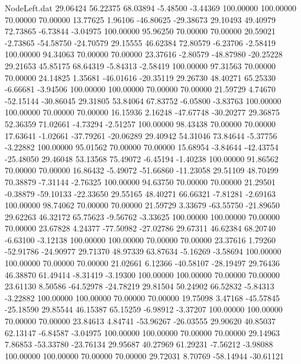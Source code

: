 \begin{filecontents}{NodeLeft.dat}
  29.06424   56.22375   68.03894    -5.48500   -3.44369  100.00000  100.00000   70.00000   70.00000   13.77625    1.96106  -46.80625  -29.38673
  29.10493   49.40979   72.73865    -6.73844   -3.04975  100.00000   95.96250   70.00000   70.00000   20.59021   -2.73865  -54.58750  -24.70579
  29.15555   46.62384   72.80579    -6.23706   -2.58419  100.00000   94.34063   70.00000   70.00000   23.37616   -2.80579  -48.87980  -20.25228
  29.21653   45.85175   68.64319    -5.84313   -2.58419  100.00000   97.31563   70.00000   70.00000   24.14825    1.35681  -46.01616  -20.35119
  29.26730   48.40271   65.25330    -6.66681   -3.94506  100.00000  100.00000   70.00000   70.00000   21.59729    4.74670  -52.15144  -30.86045
  29.31805   53.84064   67.83752    -6.05800   -3.83763  100.00000  100.00000   70.00000   70.00000   16.15936    2.16248  -47.67748  -30.20277
  29.36875   52.36359   71.02661    -4.73294   -2.51257  100.00000   98.43438   70.00000   70.00000   17.63641   -1.02661  -37.79261  -20.06289
  29.40942   54.31046   73.84644    -5.37756   -3.22882  100.00000   95.01562   70.00000   70.00000   15.68954   -3.84644  -42.43754  -25.48050
  29.46048   53.13568   75.49072    -6.45194   -1.40238  100.00000   91.86562   70.00000   70.00000   16.86432   -5.49072  -51.66860  -11.23058
  29.51109   48.70499   70.38879    -7.31144   -2.76325  100.00000   94.63750   70.00000   70.00000   21.29501   -0.38879  -59.10133  -22.33650
  29.55165   48.40271   66.66321    -7.81281   -2.69163  100.00000   98.74062   70.00000   70.00000   21.59729    3.33679  -63.55750  -21.89650
  29.62263   46.32172   65.75623    -9.56762   -3.33625  100.00000  100.00000   70.00000   70.00000   23.67828    4.24377  -77.50982  -27.02786
  29.67311   46.62384   68.20740    -6.63100   -3.12138  100.00000  100.00000   70.00000   70.00000   23.37616    1.79260  -52.91786  -24.90977
  29.71370   48.97339   63.87634    -5.16269   -3.58694  100.00000  100.00000   70.00000   70.00000   21.02661    6.12366  -40.58107  -28.19497
  29.76436   46.38870   61.49414    -8.31419   -3.19300  100.00000  100.00000   70.00000   70.00000   23.61130    8.50586  -64.52978  -24.78219
  29.81504   50.24902   66.52832    -5.84313   -3.22882  100.00000  100.00000   70.00000   70.00000   19.75098    3.47168  -45.57845  -25.18590
  29.85544   46.15387   65.15259    -6.98912   -3.37207  100.00000  100.00000   70.00000   70.00000   23.84613    4.84741  -53.96267  -26.03555
  29.90620   40.85037   62.13147    -6.84587   -3.04975  100.00000  100.00000   70.00000   70.00000   29.14963    7.86853  -53.33780  -23.76134
  29.95687   40.27969   61.29231    -7.56212   -3.98088  100.00000  100.00000   70.00000   70.00000   29.72031    8.70769  -58.14944  -30.61121

\end{filecontents}
